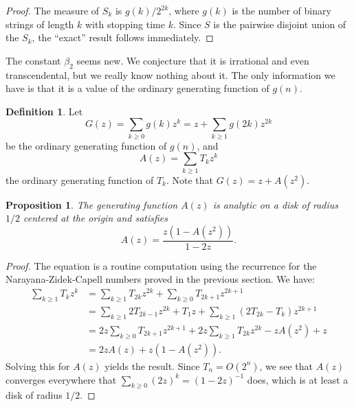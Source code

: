 \documentclass[12pt]{article}
\newtheorem{proposition}{Proposition}
\theoremstyle{definition}
\newtheorem{definition}{Definition}
\begin{document}
\begin{proof}
    The measure of $S_k$ is $g(k) / 2^{2k}$, where $g(k)$ is the number of
    binary strings of length $k$ with stopping time $k$. Since $S$ is the
    pairwise disjoint union of the $S_k$, the ``exact'' result follows
    immediately.
\end{proof}

The constant $\beta_2$ seems new. We conjecture that it is irrational and even
transcendental, but we really know nothing about it. The only information we
have is that it is a value of the ordinary generating function of $g(n)$.

\begin{definition}
    Let
    \begin{equation*}
        G(z) = \sum_{k \geq 0} g(k) z^k = z + \sum_{k \geq 1} g(2k) z^{2k}
    \end{equation*}
    be the ordinary generating function of $g(n)$, and
    \begin{equation*}
        A(z) = \sum_{k \geq 1} T_k z^k
    \end{equation*}
    the ordinary generating function of $T_k$. Note that $G(z) = z + A(z^2)$.
\end{definition}

\begin{proposition}
    The generating function $A(z)$ is analytic on a disk of radius $1 / 2$
    centered at the origin and satisfies
    \begin{equation*}
        A(z) = \frac{z(1 - A(z^2))}{1 - 2z}.
    \end{equation*}
\end{proposition}

\begin{proof}
    The equation is a routine computation using the recurrence for the Narayana-Zidek-Capell numbers proved in
    the previous section. We have:
    \begin{align*}
        \sum_{k \geq 1} T_k z^k
            &= \sum_{k \geq 1} T_{2k} z^{2k} + \sum_{k \geq 0} T_{2k+1} z^{2k + 1} \\
            &= \sum_{k \geq 1} 2 T_{2k-1} z^{2k} + T_1 z + \sum_{k \geq 1} (2T_{2k} - T_k) z^{2k + 1} \\
            &= 2 z \sum_{k \geq 0} T_{2k+1} z^{2k + 1} + 2 z \sum_{k \geq 1} T_{2k} z^{2k} - z A(z^2) + z \\
            &= 2z A(z) + z(1 - A(z^2)).
    \end{align*}
    Solving this for $A(z)$ yields the result. Since $T_n =
    O(2^n)$, we see that $A(z)$ converges everywhere that $\sum_{k \geq 0} (2z)^k = (1 -
    2z)^{-1}$ does, which is at least a disk of radius $1/2$.
\end{proof}
\end{document}
